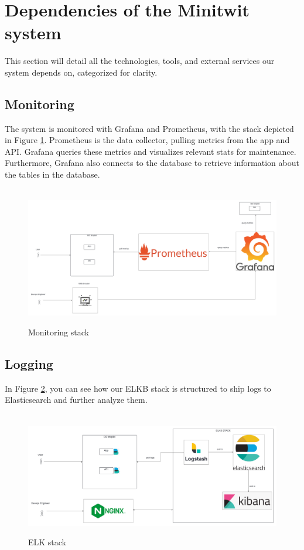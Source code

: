 \documentclass[12pt, a4paper, oneside]{book}
\begin{document}
\section{Dependencies of the Minitwit system}

This section will detail all the technologies, tools, and external services our system depends on, categorized for clarity.

\subsection{Monitoring}\label{sec:monitoring-architecture}
The system is monitored with Grafana and Prometheus, with the stack depicted in Figure \ref{fig:monitoring-stack}.
Prometheus is the data collector, pulling metrics from the app and API.
Grafana queries these metrics and visualizes relevant stats for maintenance.
Furthermore, Grafana also connects to the database to retrieve information about the tables in the database.

\begin{figure}[H]
    \centering
    \hbox{\hspace{-5em}
    \includegraphics[scale = 0.3]{images/grafana.png}}
    \caption{Monitoring stack}
    \label{fig:monitoring-stack}
\end{figure}

\subsection{Logging}\label{sec:logging-architecture}

In Figure \ref{fig:elk-stack}, you can see how our ELKB stack is structured to ship logs to Elasticsearch and further analyze them.
\begin{figure}[H]
    \centering
    \hbox{\hspace{-6em}
    \includegraphics[scale = 0.37]{images/elk.png}}
    \caption{ELK stack}
    \label{fig:elk-stack}
\end{figure}
\end{document}
